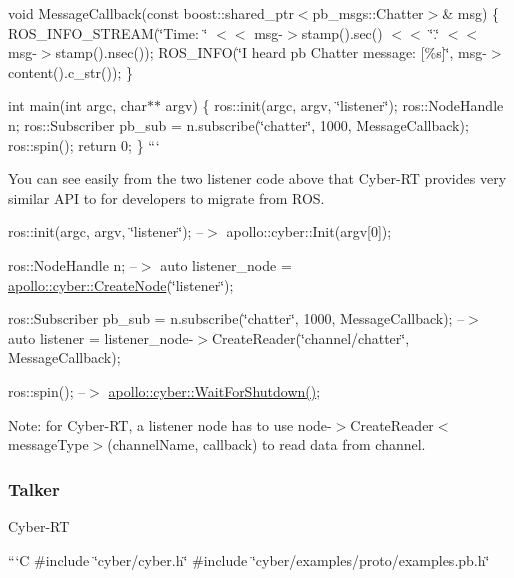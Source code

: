 void Message\-Callback(const boost\-::shared\-\_\-ptr$<$pb\-\_\-msgs\-::\-Chatter$>$\& msg) \{ R\-O\-S\-\_\-\-I\-N\-F\-O\-\_\-\-S\-T\-R\-E\-A\-M(\char`\"{}\-Time\-: \char`\"{} $<$$<$ msg-\/$>$stamp().sec() $<$$<$ \char`\"{}.\char`\"{} $<$$<$ msg-\/$>$stamp().nsec()); R\-O\-S\-\_\-\-I\-N\-F\-O(\char`\"{}\-I heard pb Chatter message\-: \mbox{[}\%s\mbox{]}\char`\"{}, msg-\/$>$content().c\-\_\-str()); \}

int main(int argc, char$\ast$$\ast$ argv) \{ ros\-::init(argc, argv, \char`\"{}listener\char`\"{}); ros\-::\-Node\-Handle n; ros\-::\-Subscriber pb\-\_\-sub = n.\-subscribe(\char`\"{}chatter\char`\"{}, 1000, Message\-Callback); ros\-::spin(); return 0; \} ```

You can see easily from the two listener code above that Cyber-\/\-R\-T provides very similar A\-P\-I to for developers to migrate from R\-O\-S.


\begin{DoxyItemize}
\item {\ttfamily ros\-::init(argc, argv, \char`\"{}listener\char`\"{});} --$>$ {\ttfamily apollo\-::cyber\-::\-Init(argv\mbox{[}0\mbox{]});}
\item {\ttfamily ros\-::\-Node\-Handle n;} --$>$ {\ttfamily auto listener\-\_\-node = \hyperlink{namespaceapollo_1_1cyber_ae369c5de0279f2a5745d0438d532bc89}{apollo\-::cyber\-::\-Create\-Node}(\char`\"{}listener\char`\"{});}
\item {\ttfamily ros\-::\-Subscriber pb\-\_\-sub = n.\-subscribe(\char`\"{}chatter\char`\"{}, 1000, Message\-Callback);} --$>$ {\ttfamily auto listener = listener\-\_\-node-\/$>$Create\-Reader(\char`\"{}channel/chatter\char`\"{}, Message\-Callback);}
\item {\ttfamily ros\-::spin();} --$>$ {\ttfamily \hyperlink{namespaceapollo_1_1cyber_a7929114e78a9c595b0ee715968ca2712}{apollo\-::cyber\-::\-Wait\-For\-Shutdown()};}
\end{DoxyItemize}

Note\-: for Cyber-\/\-R\-T, a listener node has to use {\ttfamily node-\/$>$Create\-Reader$<$message\-Type$>$(channel\-Name, callback)} to read data from channel.

\subsubsection*{Talker}

Cyber-\/\-R\-T

```\-C \#include \char`\"{}cyber/cyber.\-h\char`\"{} \#include \char`\"{}cyber/examples/proto/examples.\-pb.\-h\char`\"{}

